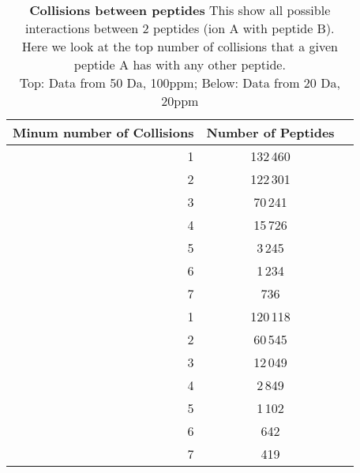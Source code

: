 \begin{table}[h]

\centering
\caption[Collisions between peptides]
{\textbf{Collisions between peptides} This show all possible interactions
between 2 peptides (ion A with peptide B). \\
Here we look at the top number of collisions that a given peptide A has with
any other peptide. \\
Top: Data from 50 Da, 100ppm; Below: Data from 20 Da, 20ppm
}
\label{tab:yeast_doublecollisions_peptide}

\begin{tabular}{ r c c }
\maketablespace
Minum number of Collisions & Number of Peptides \\
\toprule

1 & \phantom{}132\,460 \\
2 & \phantom{}122\,301 \\
3 & \phantom{}70\,241 \\
4 & \phantom{}15\,726 \\
5 & 3\,245 \\
6 & 1\,234 \\
7 & \phantom{1\,}736 \\

\midrule

1 & \phantom{}120\,118 \\
2 & \phantom{}60\,545 \\
3 & \phantom{}12\,049 \\
4 & 2\,849 \\
5 & 1\,102 \\
6 & \phantom{1\,}642 \\
7 & \phantom{1\,}419 \\


\end{tabular}
\end{table}



